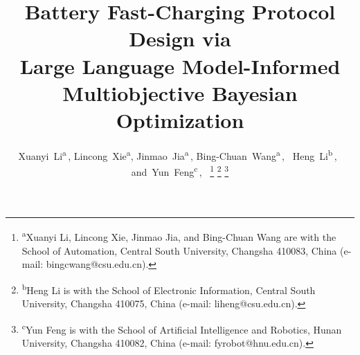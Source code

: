 \documentclass[journal]{IEEEtran}
\begin{document}
\title{Battery Fast-Charging Protocol Design via\\
Large Language Model-Informed Multiobjective Bayesian Optimization}

\author{%
Xuanyi~Li\textsuperscript{a}\,,
Lincong~Xie\textsuperscript{a}, Jinmao~Jia\textsuperscript{a}\,,
Bing-Chuan~Wang\textsuperscript{a}\,,~
Heng~Li\textsuperscript{b}\,,~
and~Yun~Feng\textsuperscript{c}\,,~%
\thanks{\textsuperscript{a}Xuanyi Li, Lincong Xie, Jinmao Jia, and Bing-Chuan Wang
are with the School of Automation,
Central South University, Changsha 410083, China (e-mail: bingcwang@csu.edu.cn).}
\thanks{\textsuperscript{b}Heng Li is with the School of Electronic Information,
Central South University, Changsha 410075, China (e-mail: liheng@csu.edu.cn).}
\thanks{\textsuperscript{c}Yun Feng is with the School of Artificial Intelligence and Robotics,
Hunan University, Changsha 410082, China (e-mail: fyrobot@hnu.edu.cn).}
}

\end{document}
